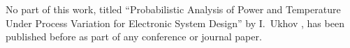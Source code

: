 No part of this work, titled ``Probabilistic Analysis of Power and Temperature Under Process Variation for Electronic System Design'' by I.~Ukhov \etal, has been published before as part of any conference or journal paper.
